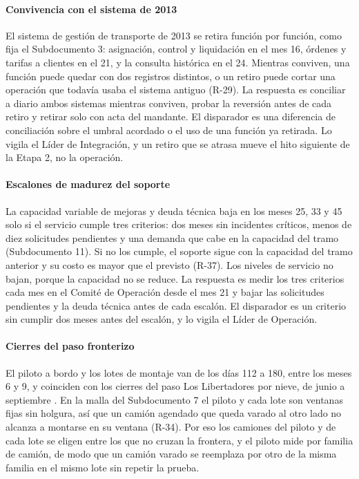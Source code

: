 \paragraph{Convivencia con el sistema de 2013}
El sistema de gestión de transporte de 2013 se retira función por función, como fija el Subdocumento 3:
asignación, control y liquidación en el mes 16, órdenes y tarifas a clientes en el 21, y la consulta
histórica en el 24. Mientras conviven, una función puede quedar con dos registros distintos, o un
retiro puede cortar una operación que todavía usaba el sistema antiguo (R-29). La respuesta es
conciliar a diario ambos sistemas mientras conviven, probar la reversión antes de cada retiro y retirar
solo con acta del mandante. El disparador es una diferencia de conciliación sobre el umbral acordado o
el uso de una función ya retirada. Lo vigila el Líder de Integración, y un retiro que se atrasa mueve el
hito siguiente de la Etapa 2, no la operación.

\paragraph{Escalones de madurez del soporte}
La capacidad variable de mejoras y deuda técnica baja en los meses 25, 33 y 45 solo si el servicio
cumple tres criterios: dos meses sin incidentes críticos, menos de diez solicitudes pendientes y una
demanda que cabe en la capacidad del tramo (Subdocumento 11). Si no los cumple, el soporte sigue con la
capacidad del tramo anterior y su costo es mayor que el previsto (R-37). Los niveles de servicio no
bajan, porque la capacidad no se reduce. La respuesta es medir los tres criterios cada mes en el Comité
de Operación desde el mes 21 y bajar las solicitudes pendientes y la deuda técnica antes de cada
escalón. El disparador es un criterio sin cumplir dos meses antes del escalón, y lo vigila el Líder de
Operación.

\paragraph{Cierres del paso fronterizo}
El piloto a bordo y los lotes de montaje van de los días 112 a 180, entre los meses 6 y 9, y coinciden con
los cierres del paso Los Libertadores por nieve, de junio a septiembre . En la
malla del Subdocumento 7 el piloto y cada lote son ventanas fijas sin holgura, así que un camión agendado
que queda varado al otro lado no alcanza a montarse en su ventana (R-34). Por eso los camiones del piloto
y de cada lote se eligen entre los que no cruzan la frontera, y el piloto mide por familia de camión, de
modo que un camión varado se reemplaza por otro de la misma familia en el mismo lote sin repetir la prueba.

